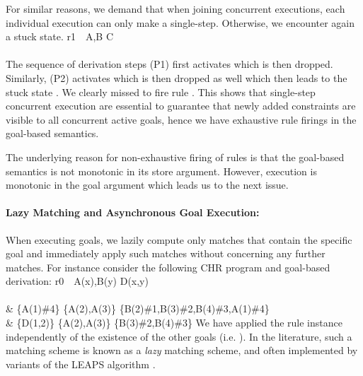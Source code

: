 \documentclass{tlp}
\begin{document}
For similar reasons, we demand that when joining concurrent executions, each individual
execution can only make a single-step. Otherwise, we encounter again a stuck state.
   r1~\atsign~A,B \simparrow C \\ \\
           { \partransstar 
             }
\eda
The sequence of derivation steps (P1) first activates  which is then dropped.
Similarly, (P2) activates  which is then dropped as well which then leads to 
the stuck state . We clearly missed to fire rule 
. This shows that single-step concurrent execution are essential
to guarantee that newly added constraints are visible to all concurrent active 
goals, hence we have exhaustive rule firings in the goal-based semantics.

The underlying reason for non-exhaustive firing of rules is that the goal-based semantics
is not monotonic in its store argument. However, execution is monotonic 
in the goal argument which leads us to the next issue.

\paragraph{\bf Lazy Matching and Asynchronous Goal Execution:}

When executing goals, we lazily compute only matches that contain the specific 
goal and immediately apply such matches without concerning any further matches.
For instance consider the following CHR program and goal-based derivation:
{\small
{} 
  r0~\atsign~A(x),B(y) \simparrow D(x,y) \\ \\
     & \chrstate
        {\{A(1)\#4\} \uplus \{A(2),A(3)\}}
        {\{B(2)\#1,B(3)\#2,B(4)\#3,A(1)\#4\}} \\
   \goaltrans &
   \chrstate
    {\{D(1,2)\} \uplus \{A(2),A(3)\}}
    {\{B(3)\#2,B(4)\#3\}}
  \ea
\eda
}
We have applied the rule instance  independently
of the existence of the other goals (i.e. ). In the literature, such a matching 
scheme is known as a {\em lazy} matching scheme, and often implemented by variants of 
the LEAPS algorithm \cite{leaps90}. 
\end{document}
